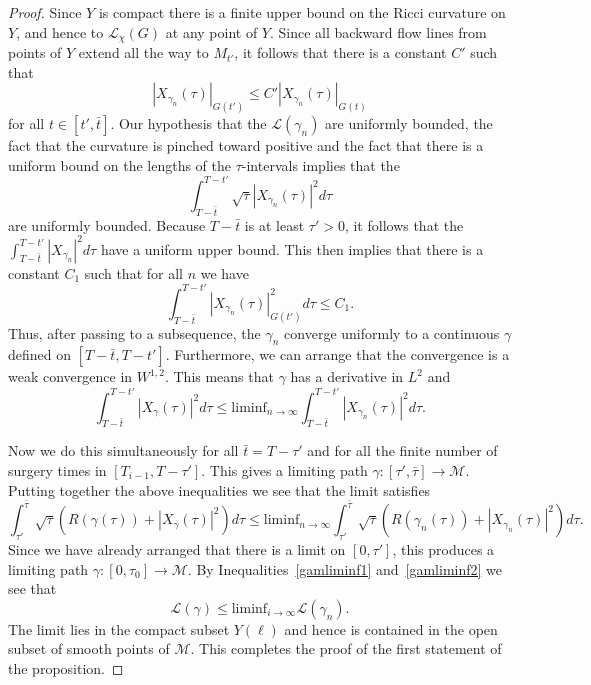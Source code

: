 \begin{proof}
 Since $Y$ is compact there is a finite upper bound on the
Ricci curvature on $Y$, and hence to ${\mathcal L}_\chi(G)$ at any
point of $Y$. Since all backward flow lines from points of $Y$
extend all the way to $M_{t'}$, it follows that there is a constant
$C'$ such that
$$|X_{\gamma_n}(\tau)|_{G(t')}\le C'|X_{\gamma_n}(\tau)|_{G(t)}$$
for all $t\in [t',\bar t]$. Our hypothesis that the ${\mathcal
L}(\gamma_n)$ are uniformly bounded, the fact that the curvature is
pinched toward positive and the fact that there is a uniform bound
on the lengths of the $\tau$-intervals implies that the
$$\int_{T-\bar t}^{T-t'} \sqrt{\tau}|X_{\gamma_n}(\tau)|^2d\tau$$
are uniformly bounded. Because $T-\bar t$ is at least $\tau'>0$, it
follows that the $\int_{T-\bar t}^{T-t'}|X_{\gamma_n}|^2d\tau$ have
a uniform upper bound. This then implies that there is a constant
$C_1$ such that for all $n$ we have
$$\int_{T-\bar t}^{T-t'}|X_{\gamma_n}(\tau)|_{G(t')}^2d\tau\le
C_1.$$ Thus, after passing to a subsequence, the $\gamma_n$ converge
uniformly to a continuous $\gamma$ defined on $[T-\bar t,T-t']$.
Furthermore, we can arrange that the convergence is a weak
convergence in $W^{1,2}$. This means that $\gamma$ has a derivative
in $L^2$ and
$$\int_{T-\bar t}^{T-t'}|X_{\gamma}(\tau)|^2d\tau\le \mathrm{liminf}_{n\rightarrow
\infty}\int_{T-\bar t}^{T-t'}|X_{\gamma_n}(\tau)|^2d\tau.$$


Now we do this simultaneously for all $\bar t=T-\tau'$ and for all the finite number of surgery times
in $[T_{i-1},T-\tau']$. This
gives a limiting path $\gamma\colon [\tau',\bar\tau]\to {\mathcal M}$.
Putting together the above inequalities we see that the limit
satisfies
\begin{equation}\label{gamliminf2}
\int_{\tau'}^{\bar\tau}\sqrt{\tau}\left(R(\gamma(\tau))+|X_\gamma(\tau)|^2\right)d\tau\le
\mathrm{liminf}_{n\rightarrow\infty}\int_{\tau'}^{\bar\tau}\sqrt{\tau}\left(R(\gamma_n(\tau))+
|X_{\gamma_n}(\tau)|^2\right)d\tau.
\end{equation}
 Since we have already
arranged that there is a limit on $[0,\tau']$, this produces a
limiting path $\gamma\colon [0,\tau_0]\to {\mathcal M}$. By
Inequalities~\ref{gamliminf1} and~\ref{gamliminf2} we see that
$${\mathcal L}(\gamma)\le \mathrm{liminf}_{i\rightarrow \infty}{\mathcal
L}(\gamma_n).$$
The limit lies in the compact subset $Y(\ell)$ and hence is contained
in the open subset of smooth points of ${\mathcal M}$.
 This completes the proof of the first statement of the proposition.


\end{proof}
